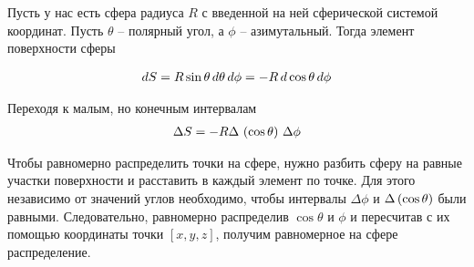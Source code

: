 Пусть у нас есть сфера радиуса $R$ с введенной на ней сферической системой координат. Пусть $\theta$ -- полярный угол, а $\phi$ -- азимутальный. Тогда элемент поверхности сферы 

\begin{gather}
dS = R \sin\theta \, d\theta \, d\phi =  -R \, d \cos\theta \, d \phi \notag
\end{gather}

Переходя к малым, но конечным интервалам
\begin{gather}
\Delta S = -R \Delta \, \left( \cos\theta \right) \, \Delta \phi \notag
\end{gather}

Чтобы равномерно распределить точки на сфере, нужно разбить сферу на равные участки поверхности и расставить в каждый элемент по точке. Для этого независимо от значений углов необходимо, чтобы интервалы $\Delta \phi$ и $\Delta \left( \cos\theta \right)$ были равными. Следовательно, равномерно распределив $\cos\theta$ и $\phi$ и пересчитав с их помощью координаты точки $\left[ x, y, z \right]$, получим равномерное на сфере распределение.

